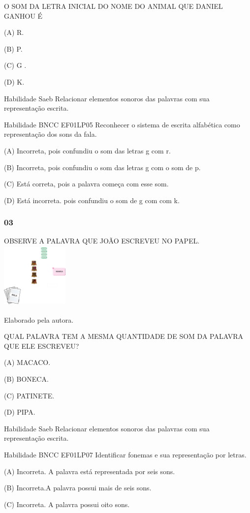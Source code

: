 \begin{escola}
O SOM DA LETRA INICIAL DO NOME DO ANIMAL QUE DANIEL GANHOU É

(A) R.

(B) P.

(C) G .

(D) K.

Habilidade Saeb Relacionar elementos sonoros das palavras com sua
representação escrita.

Habilidade BNCC EF01LP05 Reconhecer o sistema de escrita alfabética como
representação dos sons da fala.

(A) Incorreta, pois confundiu o som das letras g com r.

(B) Incorreta, pois confundiu o som das letras g com o som de p.

(C) Está correta, pois a palavra começa com esse som.

(D) Está incorreta. pois confundiu o som de g com com k.

\subsubsection{03}\label{section-28}

OBSERVE A PALAVRA QUE JOÃO ESCREVEU NO
PAPEL.\includegraphics[width=1.29792in,height=1.27986in]{media/image188.png}

Elaborado pela autora.

QUAL PALAVRA TEM A MESMA QUANTIDADE DE SOM DA PALAVRA QUE ELE ESCREVEU?

(A) MACACO.

(B) BONECA.

(C) PATINETE.

(D) PIPA.

Habilidade Saeb Relacionar elementos sonoros das palavras com sua
representação escrita.

Habilidade BNCC EF01LP07 Identificar fonemas e sua representação por
letras.

(A) Incorreta. A palavra está representada por seis sons.

(B) Incorreta.A palavra possui mais de seis sons.

(C) Incorreta. A palavra possui oito sons.


\end{escola}
